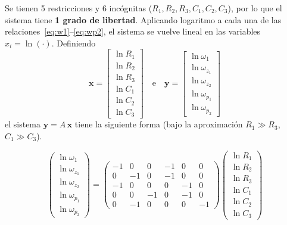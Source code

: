 Se tienen 5 restricciones y 6 incógnitas ($R_1, R_2, R_3, C_1, C_2, C_3$), por lo que el sistema tiene \textbf{1 grado de libertad}. Aplicando logaritmo a cada una de las relaciones~\eqref{eq:w1}--\eqref{eq:wp2}, el sistema se vuelve lineal en las variables $x_i = \ln(\cdot)$. Definiendo
\[
    \mathbf{x} = \begin{bmatrix} \ln R_1 \\ \ln R_2 \\ \ln R_3 \\ \ln C_1 \\ \ln C_2 \\ \ln C_3 \end{bmatrix} \quad \text{e} \quad
    \mathbf{y} = \begin{bmatrix} \ln \omega_1 \\ \ln \omega_{z_1} \\ \ln \omega_{z_2} \\ \ln \omega_{p_1} \\ \ln \omega_{p_2} \end{bmatrix}
\]
el sistema $\mathbf{y} = A\,\mathbf{x}$ tiene la siguiente forma (bajo la aproximación $R_1 \gg R_3$, $C_1 \gg C_3$).

\begin{equation*}
    \begin{pmatrix} \ln \omega_1 \\ \ln \omega_{z_1} \\ \ln \omega_{z_2} \\ \ln \omega_{p_1} \\ \ln \omega_{p_2} \end{pmatrix}
    =
    \begin{pmatrix}
        -1 & 0  & 0  & -1 & 0  & 0  \\
         0 & -1 & 0  & -1 & 0  & 0  \\
        -1 & 0  & 0  & 0  & -1 & 0  \\
         0 & 0  & -1 & 0  & -1 & 0  \\
         0 & -1 & 0  & 0  & 0  & -1
    \end{pmatrix}
    \begin{pmatrix} \ln R_1 \\ \ln R_2 \\ \ln R_3 \\ \ln C_1 \\ \ln C_2 \\ \ln C_3 \end{pmatrix}
\end{equation*}


